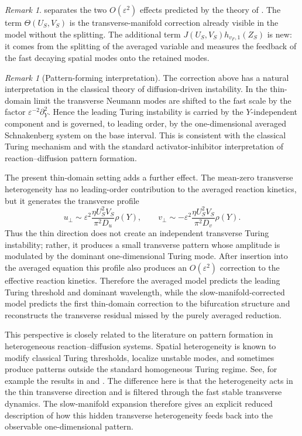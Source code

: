 \documentclass[11pt]{article}
\theoremstyle{definition}
\theoremstyle{remark}
\newtheorem{remark}[theorem]{Remark}
\numberwithin{equation}{section}
\begin{document}
\begin{remark}
 separates the two \(O(\varepsilon^2)\) effects predicted by the theory of .
The term \(\Theta(U_S,V_S)\) is the transverse-manifold correction already visible in the model without the splitting.
The additional term \(J(U_S,V_S)h_{v_F,1}(Z_S)\) is new: it comes from the splitting of the averaged variable and measures the feedback of the fast decaying spatial modes onto the retained modes.
\end{remark}

\begin{remark}[Pattern-forming interpretation]
The correction above has a natural interpretation in the classical theory of diffusion-driven instability. In the thin-domain limit the transverse Neumann modes are shifted to the fast scale by the factor \(\varepsilon^{-2}\partial_Y^2\). 
Hence the leading Turing instability is carried by the \(Y\)-independent component and is governed, to leading order, by the one-dimensional averaged Schnakenberg system on the base interval.
This is consistent with the classical Turing mechanism and with the standard activator-inhibitor interpretation of reaction--diffusion pattern formation.

The present thin-domain setting adds a further effect.
The mean-zero transverse heterogeneity has no leading-order contribution to the averaged
reaction kinetics, but it generates the transverse profile
\[
  u_\perp \sim
  \varepsilon^2
  \frac{\eta U_S^2V_S}{\pi^2D_u}\rho(Y),
  \qquad
  v_\perp \sim
  -\varepsilon^2
  \frac{\eta U_S^2V_S}{\pi^2D_v}\rho(Y).
\]
Thus the thin direction does not create an independent transverse Turing
instability; rather, it produces a small transverse pattern whose amplitude
is modulated by the dominant one-dimensional Turing mode. After insertion
into the averaged equation this profile also produces an
\(O(\varepsilon^2)\) correction to the effective reaction kinetics.
Therefore the averaged model predicts the leading Turing threshold and dominant
wavelength, while the slow-manifold-corrected model predicts the first
thin-domain correction to the bifurcation structure and reconstructs the
transverse residual missed by the purely averaged reduction.

This perspective is closely related to the literature on pattern formation
in heterogeneous reaction--diffusion systems.
Spatial heterogeneity is known to modify classical Turing thresholds, localize unstable modes, and sometimes produce patterns outside the standard homogeneous Turing regime.
See, for example the results in \cite{PageMainiMonk2003} and \cite{KrauseKlikaWoolleyGaffney2020}.
The difference here is that the heterogeneity acts in the thin transverse
direction and is filtered through the fast stable transverse dynamics. The
slow-manifold expansion therefore gives an explicit reduced description of
how this hidden transverse heterogeneity feeds back into the observable
one-dimensional pattern.
\end{remark}
\end{document}
